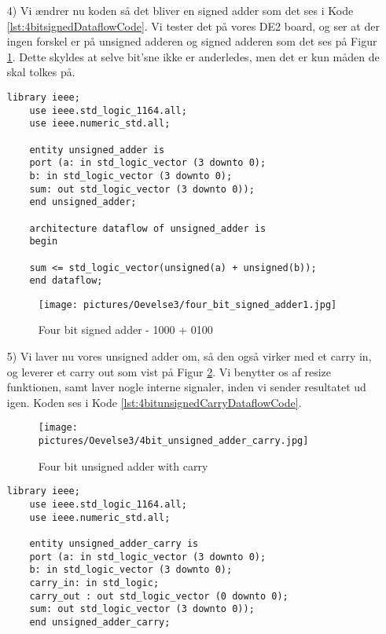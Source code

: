\begin{enumerate}
	\item[4)]
	Vi ændrer nu koden så det bliver en signed adder som det ses i Kode \ref{lst:4bitsignedDataflowCode}. Vi tester det på vores DE2 board, og ser at der ingen forskel er på unsigned adderen og signed adderen som det ses på Figur \ref{fig:4bitSignedAdder1100}. Dette skyldes at selve bit'sne ikke er anderledes, men det er kun måden de skal tolkes på.
	
	\begin{lstlisting}[caption={Four bit signed adder Dataflow VHDL kode},label={lst:4bitsignedDataflowCode}]
	library ieee;
	use ieee.std_logic_1164.all;
	use ieee.numeric_std.all;
	
	entity unsigned_adder is
	port (a: in std_logic_vector (3 downto 0);
	b: in std_logic_vector (3 downto 0);
	sum: out std_logic_vector (3 downto 0));
	end unsigned_adder;
	
	architecture dataflow of unsigned_adder is
	begin
	
	sum <= std_logic_vector(unsigned(a) + unsigned(b));
	end dataflow;
	\end{lstlisting}
	
	\begin{figure}[htpb]
		\centering
		\texttt{[image: pictures/Oevelse3/four\_bit\_signed\_adder1.jpg]}
		\caption{Four bit signed adder - 1000 + 0100}
		\label{fig:4bitSignedAdder1100}
	\end{figure}
	\FloatBarrier
\item[5)]
Vi laver nu vores unsigned adder om, så den også virker med et carry in, og leverer et carry out som vist på Figur \ref{fig:4bitUnsignedAdderCarry}. Vi benytter os af resize funktionen, samt laver nogle interne signaler, inden vi sender resultatet ud igen. Koden ses i Kode \ref{lst:4bitunsignedCarryDataflowCode}.
	\begin{figure}[H]
		\centering
		\texttt{[image: pictures/Oevelse3/4bit\_unsigned\_adder\_carry.jpg]}
		\caption{Four bit unsigned adder with carry}
		\label{fig:4bitUnsignedAdderCarry}
	\end{figure}

	\begin{lstlisting}[caption={Four bit unsigned adder with carry Dataflow VHDL kode},label={lst:4bitunsignedCarryDataflowCode}]
	library ieee;
	use ieee.std_logic_1164.all;
	use ieee.numeric_std.all;
	
	entity unsigned_adder_carry is
	port (a: in std_logic_vector (3 downto 0);
	b: in std_logic_vector (3 downto 0);
	carry_in: in std_logic;
	carry_out : out std_logic_vector (0 downto 0);
	sum: out std_logic_vector (3 downto 0));
	end unsigned_adder_carry;
	

\end{lstlisting}
\end{enumerate}
